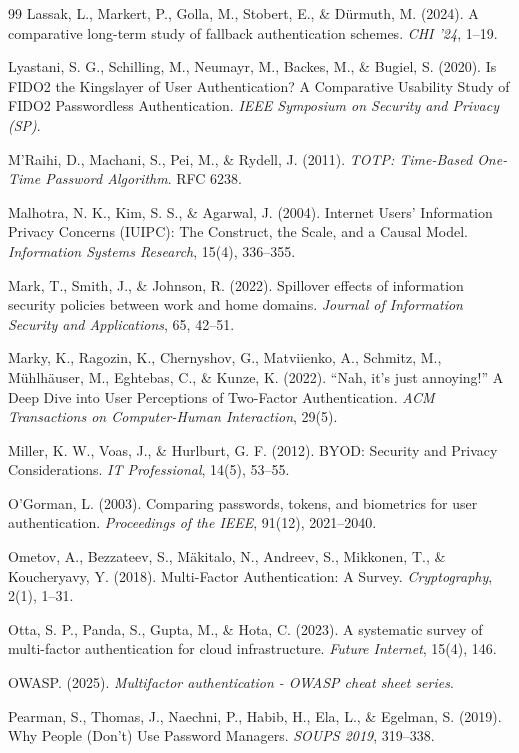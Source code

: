 \begin{thebibliography}{99}
Lassak, L., Markert, P., Golla, M., Stobert, E., \& Dürmuth, M. (2024). A comparative long-term study of fallback authentication schemes. \textit{CHI '24}, 1--19.

Lyastani, S. G., Schilling, M., Neumayr, M., Backes, M., & Bugiel, S. (2020). Is FIDO2 the Kingslayer of User Authentication? A Comparative Usability Study of FIDO2 Passwordless Authentication. \textit{IEEE Symposium on Security and Privacy (SP)}.

M’Raihi, D., Machani, S., Pei, M., \& Rydell, J. (2011). \textit{TOTP: Time-Based One-Time Password Algorithm}. RFC 6238.

Malhotra, N. K., Kim, S. S., \& Agarwal, J. (2004). Internet Users’ Information Privacy Concerns (IUIPC): The Construct, the Scale, and a Causal Model. \textit{Information Systems Research}, 15(4), 336--355.

Mark, T., Smith, J., \& Johnson, R. (2022). Spillover effects of information security policies between work and home domains. \textit{Journal of Information Security and Applications}, 65, 42--51.

Marky, K., Ragozin, K., Chernyshov, G., Matviienko, A., Schmitz, M., Mühlhäuser, M., Eghtebas, C., \& Kunze, K. (2022). ``Nah, it’s just annoying!'' A Deep Dive into User Perceptions of Two-Factor Authentication. \textit{ACM Transactions on Computer-Human Interaction}, 29(5).

Miller, K. W., Voas, J., \& Hurlburt, G. F. (2012). BYOD: Security and Privacy Considerations. \textit{IT Professional}, 14(5), 53--55.

O’Gorman, L. (2003). Comparing passwords, tokens, and biometrics for user authentication. \textit{Proceedings of the IEEE}, 91(12), 2021--2040.

Ometov, A., Bezzateev, S., Mäkitalo, N., Andreev, S., Mikkonen, T., \& Koucheryavy, Y. (2018). Multi-Factor Authentication: A Survey. \textit{Cryptography}, 2(1), 1--31.

Otta, S. P., Panda, S., Gupta, M., \& Hota, C. (2023). A systematic survey of multi-factor authentication for cloud infrastructure. \textit{Future Internet}, 15(4), 146.

OWASP. (2025). \textit{Multifactor authentication - OWASP cheat sheet series}.

Pearman, S., Thomas, J., Naechni, P., Habib, H., Ela, L., \& Egelman, S. (2019). Why People (Don't) Use Password Managers. \textit{SOUPS 2019}, 319--338.


\end{thebibliography}
